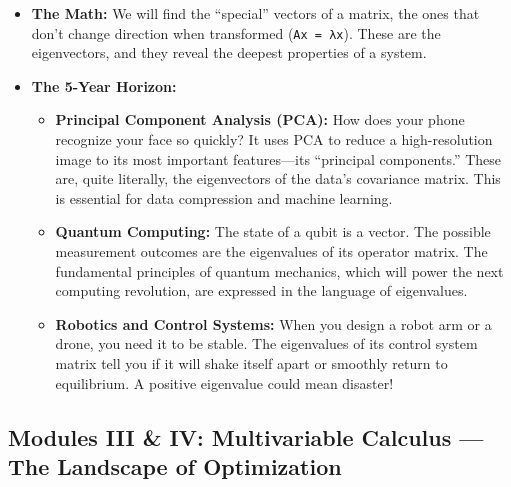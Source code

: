 \documentclass[
  letterpaper,
  DIV=11,
  numbers=noendperiod]{scrreprt}
\providecommand{\tightlist}{%
  \setlength{\itemsep}{0pt}\setlength{\parskip}{0pt}}
\begin{document}
\begin{itemize}
\tightlist
\item
  \textbf{The Math:} We will find the ``special'' vectors of a matrix,
  the ones that don't change direction when transformed
  (\texttt{Ax\ =\ λx}). These are the eigenvectors, and they reveal the
  deepest properties of a system.
\item
  \textbf{The 5-Year Horizon:}

  \begin{itemize}
  \tightlist
  \item
    \textbf{Principal Component Analysis (PCA):} How does your phone
    recognize your face so quickly? It uses PCA to reduce a
    high-resolution image to its most important features---its
    ``principal components.'' These are, quite literally, the
    eigenvectors of the data's covariance matrix. This is essential for
    data compression and machine learning.
  \item
    \textbf{Quantum Computing:} The state of a qubit is a vector. The
    possible measurement outcomes are the eigenvalues of its operator
    matrix. The fundamental principles of quantum mechanics, which will
    power the next computing revolution, are expressed in the language
    of eigenvalues.
  \item
    \textbf{Robotics and Control Systems:} When you design a robot arm
    or a drone, you need it to be stable. The eigenvalues of its control
    system matrix tell you if it will shake itself apart or smoothly
    return to equilibrium. A positive eigenvalue could mean disaster!
  \end{itemize}
\end{itemize}

\subsection{Modules III \& IV: Multivariable Calculus --- The Landscape
of
Optimization}\label{modules-iii-iv-multivariable-calculus-the-landscape-of-optimization}
\end{document}
